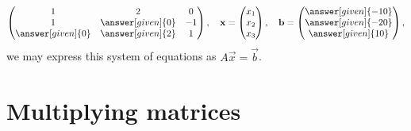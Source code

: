 \documentclass{ximera}
\begin{document}
\begin{example}
\begin{explanation}
\[\begin{pmatrix}
        1 & 2 & 0\\
        1 & \answer[given]{0} & -1 \\
        \answer[given]{0} & \answer[given]{2} & 1
      \end{pmatrix},
      \quad
      \vec{x} =
      \begin{pmatrix}
        x_1\\
        x_2\\
        x_3
      \end{pmatrix},
      \quad
      \vec{b} =
      \begin{pmatrix}
        \answer[given]{-10}\\
        \answer[given]{-20}\\
        \answer[given]{10}
      \end{pmatrix},
    \]
    we may express this system of equations as $A\vec{x} = \vec{b}$.
  \end{explanation}
\end{example}













\section{Multiplying matrices}
\end{document}
